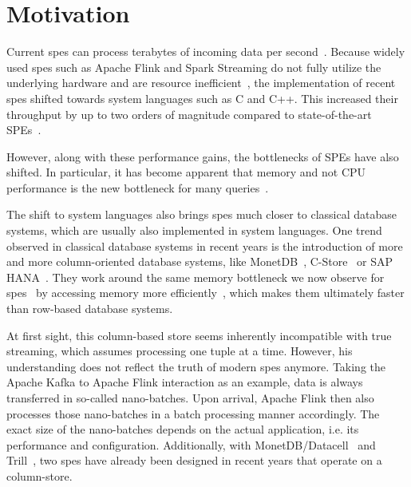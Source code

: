 \section{Motivation}
\label{sec:motivation}

Current \acp{spe} can process terabytes of incoming data per second~\cite[]{alibaba}.
Because widely used \acp{spe} such as Apache Flink and Spark Streaming do not fully utilize the underlying hardware and are resource inefficient~\cite[]{DBLP:conf/icde/ZhangHDZH17,DBLP:journals/pvldb/ZeuchBRMKLRTM19}, the implementation of recent \acp{spe} shifted towards system languages such as C and C++. 
This increased their throughput by up to two orders of magnitude compared to state-of-the-art SPEs~\cite[]{DBLP:journals/pvldb/ZeuchBRMKLRTM19}.

However, along with these performance gains, the bottlenecks of SPEs have also shifted.
In particular, it has become apparent that memory and not CPU performance is the new bottleneck for many queries~\cite[]{bollmeier2021processor}.

The shift to system languages also brings \acp{spe} much closer to classical database systems, which are usually also implemented in system languages.
One trend observed in classical database systems in recent years is the introduction of more and more column-oriented database systems, like MonetDB~\cite[]{DBLP:journals/debu/IdreosGNMMK12,DBLP:conf/cidr/BonczZN05,DBLP:journals/vldb/BonczK99}, C-Store~\cite[]{DBLP:conf/vldb/StonebrakerABCCFLLMOORTZ05} or SAP HANA~\cite[]{DBLP:conf/sigmod/SikkaFLCPB12}.
They work around the same memory bottleneck we now observe for \acp{spe}~\cite[]{DBLP:conf/vldb/BonczMK99} by accessing memory more efficiently~\cite[]{DBLP:conf/sigmod/AbadiMH08}, which makes them ultimately faster than row-based database systems.

At first sight, this column-based store seems inherently incompatible with true streaming, which assumes processing one tuple at a time.
However, his understanding does not reflect the truth of modern \acp{spe} anymore.
Taking the Apache Kafka to Apache Flink interaction as an example, data is always transferred in so-called nano-batches.
Upon arrival, Apache Flink then also processes those nano-batches in a batch processing manner accordingly.
The exact size of the nano-batches depends on the actual application, i.e. its performance and configuration.
Additionally, with MonetDB/Datacell~\cite[]{DBLP:journals/pvldb/LiarouIMK12} and Trill~\cite[]{DBLP:journals/pvldb/ChandramouliGBDPTW14}, two \acp{spe} have already been designed in recent years that operate on a column-store.

